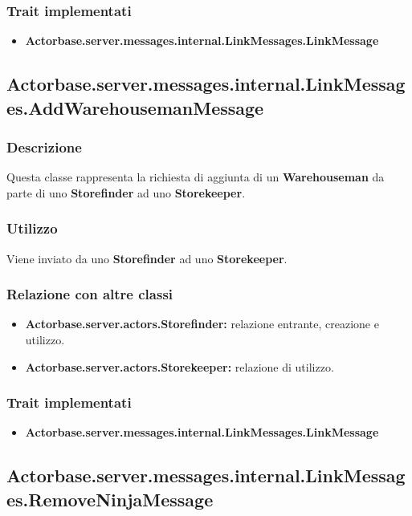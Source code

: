 \documentclass[a4paper]{article}
\begin{document}
			\subsubsection{Trait implementati}
				\begin{itemize}
					\item \textbf{Actorbase.server.messages.internal.LinkMessages.LinkMessage} 
				\end{itemize}
				
		\subsection{Actorbase.server.messages.internal.LinkMessages.AddWarehousemanMessage}
			\subsubsection{Descrizione}
				Questa classe rappresenta la richiesta di aggiunta di un \textbf{Warehouseman} da parte di uno \textbf{Storefinder} 
				ad uno \textbf{Storekeeper}.
				
			\subsubsection{Utilizzo}
				Viene inviato da uno \textbf{Storefinder} ad uno \textbf{Storekeeper}.
				
			\subsubsection{Relazione con altre classi}
				\begin{itemize}
					\item \textbf{Actorbase.server.actors.Storefinder:} relazione entrante, creazione e utilizzo.
					\item \textbf{Actorbase.server.actors.Storekeeper:} relazione di utilizzo.
				\end{itemize}
				
			\subsubsection{Trait implementati}
				\begin{itemize}
					\item \textbf{Actorbase.server.messages.internal.LinkMessages.LinkMessage} 
				\end{itemize}
				
		\subsection{Actorbase.server.messages.internal.LinkMessages.RemoveNinjaMessage}
\end{document}
